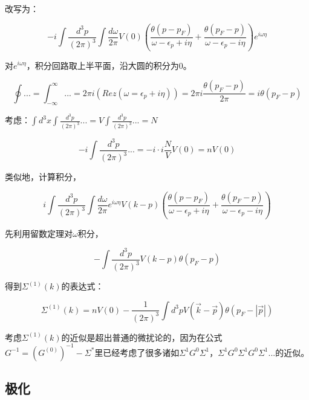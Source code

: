 改写为：

\begin{equation*}
-i \int \frac{d^3 p}{(2 \pi)^3} \int \frac{ d \omega }{ 2 \pi } V(0) \left( \frac{\theta(p - p_F)}{ \omega - \epsilon_p + i \eta } + \frac{ \theta(p_F - p) }{ \omega - \epsilon_p - i \eta }    \right) e^{i \omega \eta}
\end{equation*}

对$e^{i \omega \eta}$，积分回路取上半平面，沿大圆的积分为0。

\begin{equation*}
\oint ... = \int_{- \infty}^{\infty} ... = 2 \pi i (Rez (\omega = \epsilon_p + i \eta)) = 2 \pi i \frac{ \theta(p_F - p) }{2 \pi} = i \theta(p_F - p)
\end{equation*}

考虑：$\int d^3 x \int \frac{d^3 p}{(2 \pi)^3} ... = V \int \frac{d^3 p}{(2 \pi)^3} ... = N $

\begin{equation*}
-i \int \frac{d^3 p}{(2 \pi)^3} ... = - i \cdot i \frac{N}{V} V(0)= n V(0) 
\end{equation*}

类似地，计算积分，

\begin{equation*}
i \int \frac{d^3 p}{(2 \pi)^3 } \int \frac{ d \omega }{ 2 \pi } e^{i \omega \eta } V(k-p) \left(  \frac{\theta(p-p_F)}{ \omega - \epsilon_p + i \eta}  + \frac{ \theta(p_F -p)  }{ \omega - \epsilon_p - i \eta }     \right)
\end{equation*}

先利用留数定理对$\omega$积分，

\begin{equation*}
 - \int \frac{d^3 p}{(2 \pi)^3 } V(k-p) \theta(p_F - p)
\end{equation*}

得到$\Sigma^{(1)}(k)$的表达式：

\begin{equation}
\Sigma^{(1)}(k) = n V(0) - \frac{1}{(2 \pi)^3} \int d^3 p V ( \vec k - \vec p ) \theta( p_F - | \vec p | )
\end{equation}

考虑$\Sigma^{(1)}(k)$的近似是超出普通的微扰论的，因为在公式$G^{-1} = \left( G^{(0)} \right)^{-1} - \Sigma^* $里已经考虑了很多诸如$\Sigma^1 G^0 \Sigma^1$，$\Sigma^1 G^0 \Sigma^1 G^0 \Sigma^1$...的近似。

\subsection{极化}

